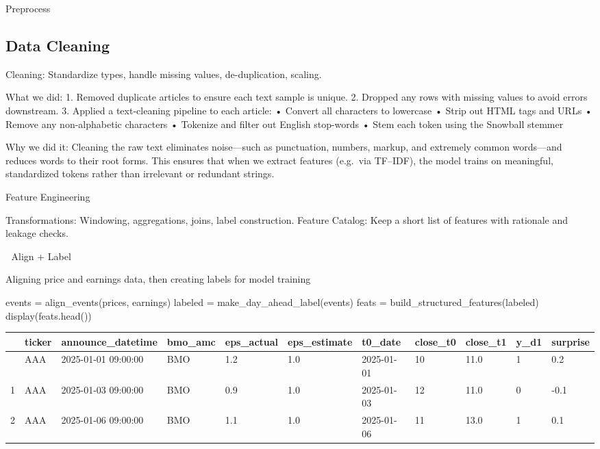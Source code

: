 \documentclass[
  letterpaper,
  DIV=11,
  numbers=noendperiod]{scrartcl}
\newenvironment{Shaded}{\begin{snugshade}}{\end{snugshade}}
\newcommand{\NormalTok}[1]{\textcolor[rgb]{0.00,0.23,0.31}{#1}}
\newcommand{\OperatorTok}[1]{\textcolor[rgb]{0.37,0.37,0.37}{#1}}
\renewenvironment{Shaded}{%
  \begin{tcolorbox}[%
    colback=codebg,%
    colframe=codebg,%
    borderline west={3pt}{0pt}{sectionblue},%
    boxrule=0pt,%
    arc=0pt,%
    boxsep=5pt,%
    left=2mm,%
    right=2mm,%
    top=2mm,%
    bottom=2mm%
  ]%
}{%
  \end{tcolorbox}%
}
\begin{document}
Preprocess

\subsection{Data Cleaning}\label{data-cleaning}

Cleaning: Standardize types, handle missing values, de-duplication,
scaling.

What we did: 1. Removed duplicate articles to ensure each text sample is
unique. 2. Dropped any rows with missing values to avoid errors
downstream. 3. Applied a text-cleaning pipeline to each article: •
Convert all characters to lowercase • Strip out HTML tags and URLs •
Remove any non-alphabetic characters • Tokenize and filter out English
stop-words • Stem each token using the Snowball stemmer

Why we did it: Cleaning the raw text eliminates noise---such as
punctuation, numbers, markup, and extremely common words---and reduces
words to their root forms. This ensures that when we extract features
(e.g.~via TF--IDF), the model trains on meaningful, standardized tokens
rather than irrelevant or redundant strings.

Feature Engineering

Transformations: Windowing, aggregations, joins, label construction.
Feature Catalog: Keep a short list of features with rationale and
leakage checks.

🔗 Align + Label

Aligning price and earnings data, then creating labels for model
training

\begin{Shaded}
\begin{Highlighting}[]
\NormalTok{events }\OperatorTok{=}\NormalTok{ align\_events(prices, earnings)}
\NormalTok{labeled }\OperatorTok{=}\NormalTok{ make\_day\_ahead\_label(events)}
\NormalTok{feats }\OperatorTok{=}\NormalTok{ build\_structured\_features(labeled)}
\NormalTok{display(feats.head())}
\end{Highlighting}
\end{Shaded}

\begin{longtable}[]{@{}lllllllllll@{}}
\toprule\noalign{}
& ticker & announce\_datetime & bmo\_amc & eps\_actual & eps\_estimate &
t0\_date & close\_t0 & close\_t1 & y\_d1 & surprise \\
\midrule\noalign{}
\endhead
\bottomrule\noalign{}
\endlastfoot
0 & AAA & 2025-01-01 09:00:00 & BMO & 1.2 & 1.0 & 2025-01-01 & 10 & 11.0
& 1 & 0.2 \\
1 & AAA & 2025-01-03 09:00:00 & BMO & 0.9 & 1.0 & 2025-01-03 & 12 & 11.0
& 0 & -0.1 \\
2 & AAA & 2025-01-06 09:00:00 & BMO & 1.1 & 1.0 & 2025-01-06 & 11 & 13.0
& 1 & 0.1 \\
\end{longtable}
\end{document}
